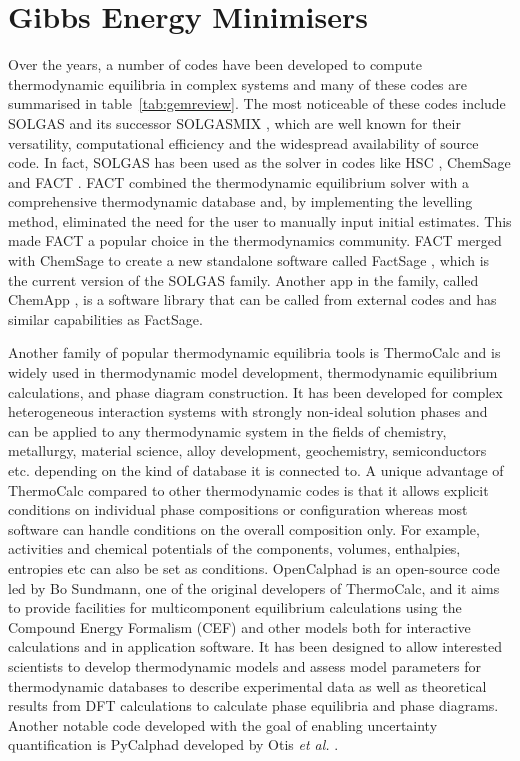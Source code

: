 \section{Gibbs Energy Minimisers}
	Over the years, a number of codes have been developed to compute thermodynamic equilibria in complex systems and many of these codes are summarised in table~\ref{tab:gemreview}. The most noticeable of these codes include SOLGAS \cite{Eriksson71} and its successor SOLGASMIX \cite{Eriksson:1975aa}, which are well known for their versatility, computational efficiency and the widespread availability of source code. In fact, SOLGAS has been used as the solver in codes like HSC \cite{HSCSoftware:aa}, ChemSage \cite{Eriksson90} and FACT \cite{Thompson83}. FACT combined the thermodynamic equilibrium solver with a comprehensive thermodynamic database and, by implementing the levelling method, eliminated the need for the user to manually input initial estimates. This made FACT a popular choice in the thermodynamics community. FACT merged with ChemSage to create a new standalone software called FactSage \cite{Bale02}, which is the current version of the SOLGAS family. Another app in the family, called ChemApp \cite{Eriksson:2008aa,Petersen:2007aa}, is a software library that can be called from external codes and has similar capabilities as FactSage.

	Another family of popular thermodynamic equilibria tools is ThermoCalc \cite{ANDERSSON2002273} and is widely used in thermodynamic model development, thermodynamic equilibrium calculations, and  phase diagram construction. It has been developed for complex heterogeneous interaction systems with strongly non-ideal solution phases and can be applied to any thermodynamic system in the fields of chemistry, metallurgy, material science, alloy development, geochemistry, semiconductors etc. depending on the kind of database it is connected to. A unique advantage of ThermoCalc compared to other thermodynamic codes is that it allows explicit conditions on individual phase compositions or configuration whereas most software can handle conditions on the overall composition only. For example, activities and chemical potentials of the components, volumes, enthalpies, entropies etc can also be set as conditions.  OpenCalphad \cite{Sundman:2015aa} is an open-source code led by Bo Sundmann, one of the original developers of ThermoCalc, and it aims to provide facilities for multicomponent equilibrium calculations using the Compound Energy Formalism (CEF) and other models both for interactive calculations and in application software. It has been designed to allow interested scientists to develop thermodynamic models and assess model parameters for thermodynamic databases to describe experimental data as well as theoretical results from DFT calculations to calculate phase equilibria and phase diagrams. Another notable code developed with the goal of enabling uncertainty quantification is PyCalphad developed by Otis \textit{et al.} \cite{Otis:2017aa}.


